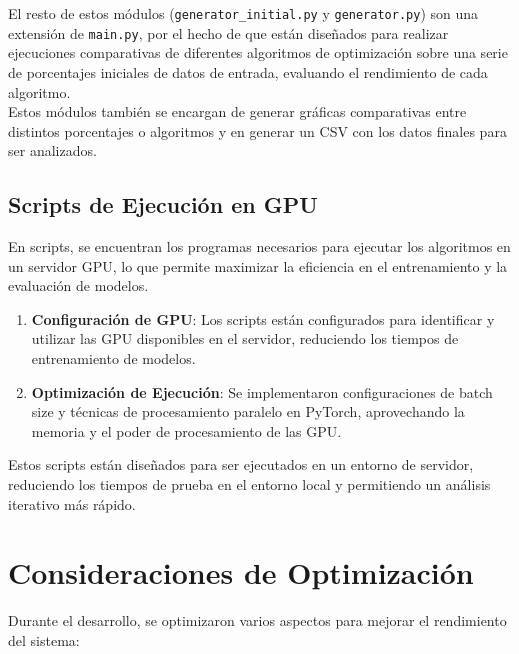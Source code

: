 El resto de estos módulos (\texttt{generator\_initial.py} y \texttt{generator.py}) son una extensión de
\texttt{main.py}, por el hecho de que están diseñados para realizar ejecuciones comparativas de diferentes algoritmos
de optimización sobre una serie de porcentajes iniciales de datos de entrada, evaluando el rendimiento de cada
algoritmo. \\[6pt]

Estos módulos también se encargan de generar gráficas comparativas entre distintos porcentajes o algoritmos y en
generar un CSV con los datos finales para ser analizados.

\subsection{Scripts de Ejecución en GPU}\label{subsec:scripts-de-ejecucion-en-gpu}
En scripts, se encuentran los programas necesarios para ejecutar los algoritmos en un servidor GPU, lo que permite
maximizar la eficiencia en el entrenamiento y la evaluación de modelos.
\begin{enumerate}
    \item \textbf{Configuración de GPU}: Los scripts están configurados para identificar y utilizar las GPU disponibles
    en el servidor, reduciendo los tiempos de entrenamiento de modelos.
    \item \textbf{Optimización de Ejecución}: Se implementaron configuraciones de batch size y técnicas de
    procesamiento paralelo en PyTorch, aprovechando la memoria y el poder de procesamiento de las GPU\@.
\end{enumerate}

Estos scripts están diseñados para ser ejecutados en un entorno de servidor, reduciendo los tiempos de prueba en el
entorno local y permitiendo un análisis iterativo más rápido.

\section{Consideraciones de Optimización}\label{sec:consideraciones-de-optimizacion}
Durante el desarrollo, se optimizaron varios aspectos para mejorar el rendimiento del sistema:

